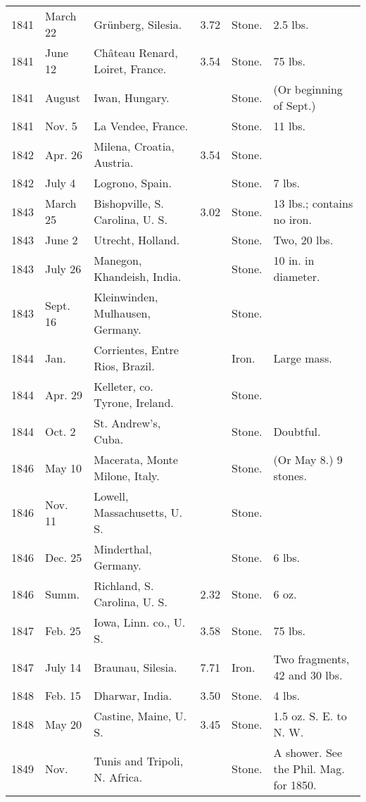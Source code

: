 \documentclass[a4paper, 12pt, oneside]{article}
\begin{document}
\begin{center}
\begin{longtable}{|p{10mm}|p{15mm}|p{32mm}|p{13mm}|p{13mm}|p{26mm}|}
        1841 & March 22 & Grünberg, Silesia. & 3.72 & Stone. & 2.5 lbs. \\
        1841 & June 12 & Château Renard, Loiret, France. & 3.54 & Stone. & 75 lbs. \\
        1841 & August & Iwan, Hungary. & ~ & Stone. & (Or beginning of Sept.) \\
        1841 & Nov. 5 & La Vendee, France. & ~ & Stone. & 11 lbs. \\
        1842 & Apr. 26 & Milena, Croatia, Austria. & 3.54 & Stone. & ~ \\
        1842 & July 4 & Logrono, Spain. & ~ & Stone. & 7 lbs. \\
        1843 & March 25 & Bishopville, S. Carolina, U. S. & 3.02 & Stone. & 13 lbs.; contains no iron. \\
        1843 & June 2 & Utrecht, Holland. & ~ & Stone. & Two, 20 lbs. \\
        1843 & July 26 & Manegon, Khandeish, India. & ~ & Stone. & 10 in. in diameter. \\
        1843 & Sept. 16 & Kleinwinden, Mulhausen, Germany. & ~ & Stone. & ~ \\
        1844 & Jan. & Corrientes, Entre Rios, Brazil. & ~ & Iron. & Large mass. \\
        1844 & Apr. 29 & Kelleter, co. Tyrone, Ireland. & ~ & Stone. & ~ \\
        1844 & Oct. 2 & St. Andrew’s, Cuba. & ~ & Stone. & Doubtful. \\
        1846 & May 10 & Macerata, Monte Milone, Italy. & ~ & Stone. & (Or May 8.) 9 stones. \\
        1846 & Nov. 11 & Lowell, Massachusetts, U. S. & ~ & Stone. & ~ \\
        1846 & Dec. 25 & Minderthal, Germany. & ~ & Stone. & 6 lbs. \\
        1846 & Summ. & Richland, S. Carolina, U. S. & 2.32 & Stone. & 6 oz. \\
        1847 & Feb. 25 & Iowa, Linn. co., U. S. & 3.58 & Stone. & 75 lbs. \\
        1847 & July 14 & Braunau, Silesia. & 7.71 & Iron. & Two fragments, 42 and 30 lbs. \\
        1848 & Feb. 15 & Dharwar, India. & 3.50 & Stone. & 4 lbs. \\
        1848 & May 20 & Castine, Maine, U. S. & 3.45 & Stone. & 1.5 oz. S. E. to N. W. \\
        1849 & Nov. & Tunis and Tripoli, N. Africa. & ~ & Stone. & A shower. See the Phil. Mag. for 1850. \\

\end{longtable}
\end{center}
\end{document}
